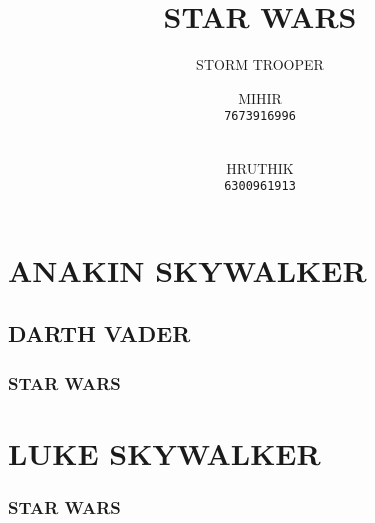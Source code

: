 \documentclass{beamer}
\title{STAR WARS}
\subtitle{STORM TROOPER}
\author{
	MIHIR\\
	\texttt{7673916996}
	\\
	\and \\
	HRUTHIK\\
	\texttt{6300961913}
}
\institute{
	MIT\\
	VIT\\
}
\begin{document}
	\maketitle
	\tableofcontents
	\section{ANAKIN SKYWALKER}
	\subsection{DARTH VADER}
	\begin{frame}
		\frametitle{STAR WARS}
	\end{frame}
	\tableofcontents
	\section{LUKE SKYWALKER}
	\begin{frame}
		\frametitle{STAR WARS}
	\end{frame}
\end{document}
